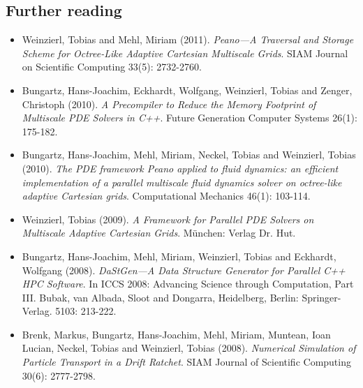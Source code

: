 \subsection*{Further reading}

\begin{itemize}
  \item Weinzierl, Tobias and Mehl, Miriam (2011). {\em Peano---A Traversal and
  Storage Scheme for Octree-Like Adaptive Cartesian Multiscale Grids}. SIAM
  Journal on Scientific Computing 33(5): 2732-2760.
  \item Bungartz, Hans-Joachim, Eckhardt, Wolfgang, Weinzierl, Tobias and
  Zenger, Christoph (2010). {\em A Precompiler to Reduce the Memory Footprint of
  Multiscale PDE Solvers in C++}. Future Generation Computer Systems 26(1): 175-182.
  \item Bungartz, Hans-Joachim, Mehl, Miriam, Neckel, Tobias and Weinzierl,
  Tobias (2010). {\em The PDE framework Peano applied to fluid dynamics: an efficient
  implementation of a parallel multiscale fluid dynamics solver on octree-like adaptive Cartesian grids}. Computational Mechanics 46(1): 103-114.
  \item   Weinzierl, Tobias (2009). {\em A Framework for Parallel PDE Solvers on
  Multiscale Adaptive Cartesian Grids}. M\"unchen: Verlag Dr. Hut.
  \item Bungartz, Hans-Joachim, Mehl, Miriam, Weinzierl, Tobias and Eckhardt,
  Wolfgang (2008). {\em DaStGen---A Data Structure Generator for Parallel C++
  HPC Software}. In ICCS 2008: Advancing Science through Computation, Part III.
  Bubak, van Albada, Sloot and Dongarra, Heidelberg, Berlin: Springer-Verlag.
  5103: 213-222.
  \item Brenk, Markus, Bungartz, Hans-Joachim, Mehl, Miriam, Muntean, Ioan
  Lucian, Neckel, Tobias and Weinzierl, Tobias (2008). {\em Numerical Simulation
  of Particle Transport in a Drift Ratchet}. SIAM Journal of Scientific Computing 30(6): 2777-2798.
\end{itemize}
